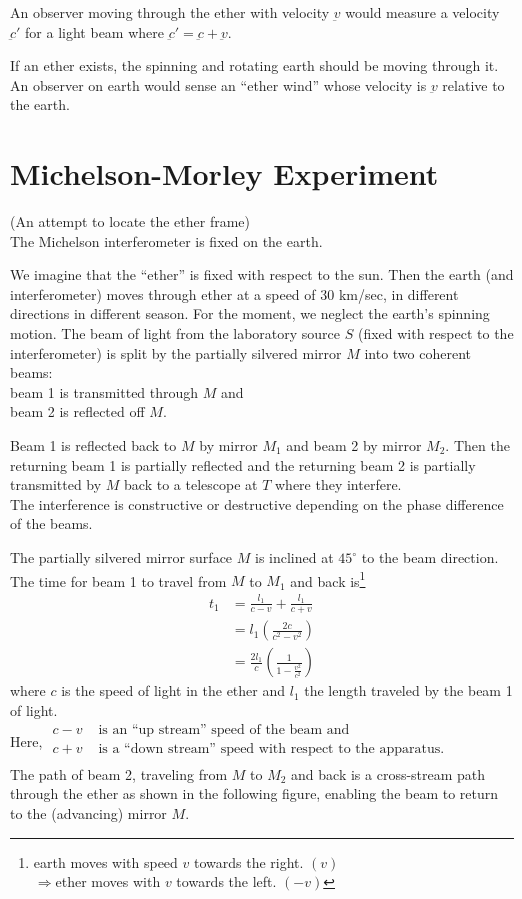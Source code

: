\documentclass[../main-sheet.tex]{subfiles}
\begin{document}
An observer moving through the ether with velocity \(\underbar{v}\) would measure a velocity \(\underbar{c }'\) for a light beam where \(\underbar{c}'=\underbar{c}+\underbar{v}\).

If an ether exists, the spinning and rotating earth should be moving through it. An observer on earth would sense an ``ether wind'' whose velocity is \(\underbar{v}\) relative to the earth.
\section{Michelson-Morley Experiment}
\footnotesize{(An attempt to locate the ether frame)}\\
\normalsize
The Michelson interferometer is fixed on the earth.

We imagine that the ``ether'' is fixed with respect to the sun. Then the earth (and interferometer) moves through ether at a speed of 30 km/sec, in different directions in different season.
For the moment, we neglect the earth's spinning motion. The beam of light from the laboratory source \(S \) (fixed with respect to the interferometer) is split by the partially silvered mirror \(M \) into two coherent beams:\\
beam 1 is transmitted through \(M \) and\\beam 2 is reflected off \(M \).

Beam 1 is reflected back to \(M \) by mirror \(M_1\) and beam 2 by mirror \(M_2\). Then the returning beam 1 is partially reflected and the returning beam 2 is partially transmitted by \(M \) back to a telescope at \(T \) where they interfere.\\
The interference is constructive or destructive depending on the phase difference of the beams.

The partially silvered mirror surface \(M \) is inclined at \(45^\circ \) to the beam direction. The time for beam 1 to travel from \(M \) to \(M_1\) and back is\footnote{earth moves with speed \(v \) towards the right. \((v)\)\\\(\Rightarrow\)ether moves with \(v \) towards the left. \((-v )\) }
\begin{align*}
    t_1&=\frac{l_1}{c-v}+\frac{l_1}{c+v}\\
    &=l_1\left(\frac{2c}{c^2-v^2}\right)\\
    &=\frac{2l_1}{c}\left(\frac{1}{1-\frac{v^2}{c^2}}\right)
\end{align*}
where \(c \) is the speed of light in the ether and \(l_1\) the length traveled by the beam 1 of light.\\
Here, \(\begin{aligned}
    c-v & \text{ is an ``up stream'' speed of the beam and}\\
    c+v & \text{ is a ``down stream'' speed with respect to the apparatus.}\\
\end{aligned}\)\\
The path of beam 2, traveling from \(M \) to \(M_2 \) and back is a cross-stream path through the ether as shown in the following figure, enabling the beam to return to the (advancing) mirror \(M \).
\end{document}
